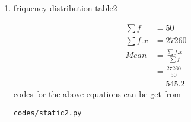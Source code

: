 \renewcommand{\theequation}{\theenumi}
\begin{enumerate}[label=\arabic*.,ref=\thesubsection.\theenumi]
\item \begin{table}[!ht]
	\centering
	
	\caption{friquency distribution table2 }
\end{table}
\begin{align}
\sum{f} &= 50
\\
\sum{f.x} &= 27260
\\
Mean &= \frac{\sum{f.x}}{\sum{f}}
\\&= \frac{27260}{50}
\\&= 545.2
\end{align}
codes for the above equations can be get from
\begin{lstlisting}
codes/static2.py
\end{lstlisting}
\end{enumerate}